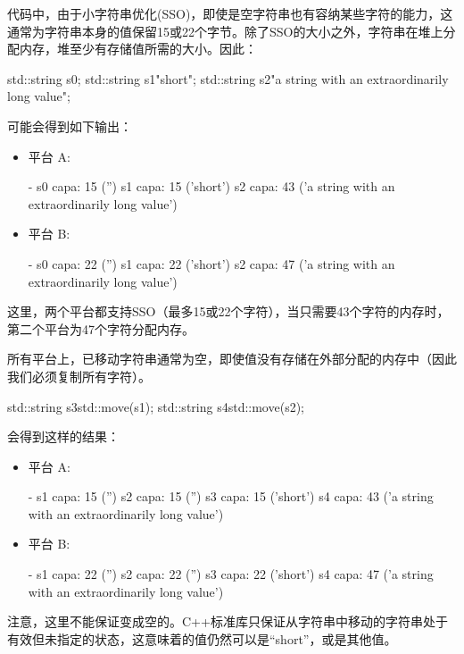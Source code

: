 代码中，由于小字符串优化(SSO)，即使是空字符串也有容纳某些字符的能力，这通常为字符串本身的值保留15或22个字节。除了SSO的大小之外，字符串在堆上分配内存，堆至少有存储值所需的大小。因此：

\begin{cppcode}
std::string s0;
std::string s1{"short"};
std::string s2{"a string with an extraordinarily long value"};
\end{cppcode}

可能会得到如下输出：

\begin{itemize}
	\item 平台 A:
	\begin{outputcode}
- s0 capa: 15 ('')
s1 capa: 15 ('short')
s2 capa: 43 ('a string with an extraordinarily long value')
	\end{outputcode}
	\item 平台 B:
	\begin{outputcode}
- s0 capa: 22 ('')
s1 capa: 22 ('short')
s2 capa: 47 ('a string with an extraordinarily long value')
	\end{outputcode}
\end{itemize}

这里，两个平台都支持SSO（最多15或22个字符），当只需要43个字符的内存时，第二个平台为47个字符分配内存。

所有平台上，已移动字符串通常为空，即使值没有存储在外部分配的内存中（因此我们必须复制所有字符）。

\begin{cppcode}
std::string s3{std::move(s1)};
std::string s4{std::move(s2)};
\end{cppcode}

会得到这样的结果：

\begin{itemize}
	\item 平台 A:
	\begin{outputcode}
- s1 capa: 15 ('')
s2 capa: 15 ('')
s3 capa: 15 ('short')
s4 capa: 43 ('a string with an extraordinarily long value')
	\end{outputcode}
	\item 平台 B:
	\begin{outputcode}
- s1 capa: 22 ('')
s2 capa: 22 ('')
s3 capa: 22 ('short')
s4 capa: 47 ('a string with an extraordinarily long value')
	\end{outputcode}
\end{itemize}

注意，这里不能保证变成空的。C++标准库只保证从字符串中移动的字符串处于有效但未指定的状态，这意味着的值仍然可以是“short”，或是其他值。

